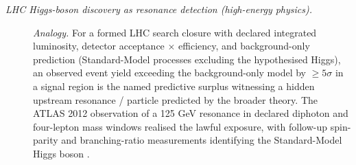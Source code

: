 \begin{description}
\item[\emph{{LHC} Higgs-boson discovery as resonance detection
(high-energy physics).}] \textit{Analogy.}
For a formed LHC search closure with declared integrated luminosity,
detector acceptance \(\times\) efficiency, and background-only
prediction (Standard-Model processes excluding the hypothesised
Higgs), an observed event yield exceeding the background-only model
by \(\ge 5\sigma\) in a signal region is the named predictive
surplus witnessing a hidden upstream resonance / particle predicted
by the broader theory.  The ATLAS 2012 observation of a 125 GeV
resonance in declared diphoton and four-lepton mass windows realised
the lawful exposure, with follow-up spin-parity and branching-ratio
measurements identifying the Standard-Model Higgs boson
\citep{ATLAS2012HiggsObservation}.
\end{description}
\endgroup

